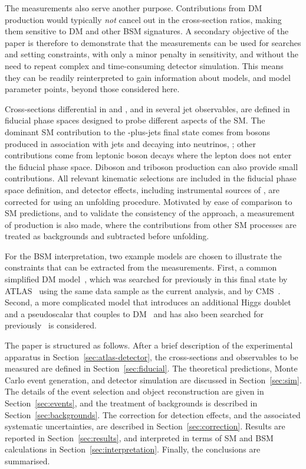 \documentclass[atlasdraft=false, cernpreprint, UKenglish, texmf, orcidlogo]{atlasdoc}
\begin{document}
The measurements also serve another purpose. Contributions from DM production would typically \textit{not} cancel out in the cross-section ratios,
making them sensitive to DM and other BSM signatures.
A secondary objective of the paper is therefore to demonstrate that the measurements can be used for searches and setting constraints,
with only a minor penalty in sensitivity, and without the need to repeat complex and time-consuming detector simulation. This means they can be readily
reinterpreted to gain information about models, and model parameter points, beyond those considered here.
 
Cross-sections differential in \ptmiss and \ptrecoil, and in several jet observables, are defined in fiducial phase spaces designed to
probe different aspects of the SM\@.
The dominant SM contribution to the \ptmiss-plus-jets final state comes from \Zboson bosons produced in association with jets and decaying into neutrinos,
\Znunujets; other contributions
come from leptonic \Wboson boson decays where the lepton does not enter the fiducial phase space. Diboson and triboson production can also
provide small contributions.
All relevant kinematic selections
are included in the fiducial phase space definition,  and detector effects, including instrumental sources of \ptmiss,  are corrected for using an
unfolding procedure.
Motivated by ease of comparison to SM predictions, and to validate the consistency of the approach, a measurement of \Znunu production
is also made, where the contributions from other SM processes are treated as backgrounds and subtracted before unfolding.
 
For the BSM interpretation, two example models are chosen to illustrate the constraints that can be extracted from the measurements.
First, a common simplified DM model~\cite{Abdallah:2015ter}, which was searched for previously in this final state by ATLAS~\cite{ATLAS:2021kxv} 
using the same data sample as the current analysis, and by CMS~\cite{CMS:2021far}.
Second, a more complicated model that introduces an additional Higgs doublet and a pseudoscalar
that couples to DM~\cite{Bauer:2017ota,LHCDarkMatterWorkingGroup:2018ufk} and has also been searched for previously~\cite{CMS:2020ulv,ATLAS:2023rvb} is considered.
 
The paper is structured as follows.  After a brief description of the experimental apparatus in Section~\ref{sec:atlas-detector},
the cross-sections and observables to be measured are defined in Section~\ref{sec:fiducial}.
The theoretical predictions, Monte Carlo event generation,
and detector simulation are discussed in Section~\ref{sec:sim}.
The details of the event selection and object reconstruction are given in Section~\ref{sec:events},  and
the treatment of backgrounds is described in Section~\ref{sec:backgrounds}.
The correction for detection effects, and the associated systematic uncertainties, are described in Section~\ref{sec:correction}.
Results are reported in Section~\ref{sec:results}, and interpreted in terms of SM and BSM calculations
in Section~\ref{sec:interpretation}. Finally, the conclusions are summarised.
 
\end{document}

